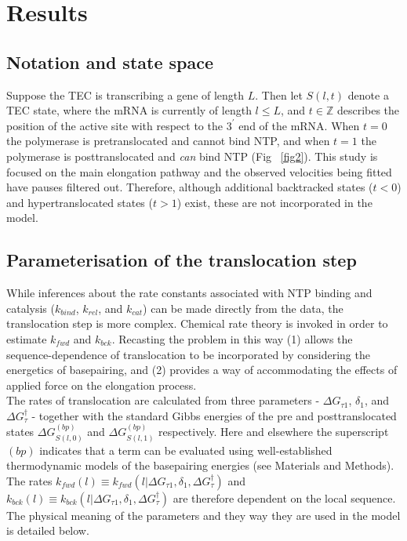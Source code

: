 \documentclass[10pt,letterpaper]{article}
\begin{document}
\section*{Results}



\subsection*{Notation and state space}


Suppose the TEC is transcribing a gene of length $L$. Then let $S(l, t)$ denote a TEC state, where the mRNA is currently of length $l \leq L$, and $t \in \mathbb{Z}$ describes the position of the active site with respect to the $3^\prime$ end of the mRNA. When $t=0$ the polymerase is pretranslocated and cannot bind NTP, and when $t=1$ the polymerase is posttranslocated and \textit{can} bind NTP  (Fig ~\ref{fig2}). This study is focused on the main elongation pathway and the observed velocities being fitted have pauses filtered out. Therefore, although additional backtracked states ($t < 0$) \cite{wang1998force, shaevitz2003backtracking, abbondanzieri2005direct} and hypertranslocated states ($t > 1$) \cite{artsimovitch2000pausing, zhou2007dissociation} exist, these are not incorporated in the model. \\



\subsection*{Parameterisation of the translocation step}


While inferences about the rate constants associated with NTP binding and catalysis ($k_{bind}$, $k_{rel}$, and $k_{cat}$) can be made directly from the data, the translocation step is more complex. Chemical rate theory is invoked in order to estimate $k_{fwd}$ and $k_{bck}$. Recasting the problem in this way (1) allows the sequence-dependence of translocation to be incorporated by considering the energetics of basepairing, and (2) provides a way of accommodating the effects of applied force on the elongation process. \\


The rates of translocation are calculated from three parameters -  $\Delta G_{\tau 1}$, $\delta_1$, and $\Delta G^\dag_{\tau}$ - together with the standard Gibbs energies of the pre and posttranslocated states $\Delta G^{(bp)}_{S(l,0)}$ and $\Delta G^{(bp)}_{S(l,1)}$ respectively. Here and elsewhere the superscript $(bp)$ indicates that a term can be evaluated using well-established thermodynamic models of the basepairing energies (see Materials and Methods). The rates $k_{fwd}(l) \equiv k_{fwd}(l|\Delta G_{\tau 1}, \delta_1, \Delta G^\dag_{\tau})$ and $k_{bck}(l) \equiv k_{bck}(l|\Delta G_{\tau 1}, \delta_1, \Delta G^\dag_{\tau})$ are therefore dependent on the local sequence. The physical meaning of the parameters and they way they are used in the model is detailed below. \\ 
\end{document}
